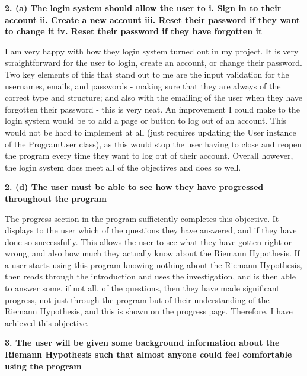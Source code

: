\documentclass[12pt]{article}
\begin{document}
\textbf{2. (a) The login system should allow the user to i. Sign in to their account ii. Create a new account iii. Reset their password if they want to change it iv. Reset their password if they have forgotten it}

I am very happy with how they login system turned out in my project. It is very straightforward for the user to login, create an account, or change their password. Two key elements of this that stand out to me are the input validation for the usernames, emails, and passwords - making sure that they are always of the correct type and structure; and also with the emailing of the user when they have forgotten their password - this is very neat. An improvement I could make to the login system would be to add a page or button to log out of an account. This would not be hard to implement at all (just requires updating the User instance of the ProgramUser class), as this would stop the user having to close and reopen the program every time they want to log out of their account. Overall however, the login system does meet all of the objectives and does so well.

\textbf{2. (d) The user must be able to see how they have progressed throughout the program}

The progress section in the program sufficiently completes this objective. It displays to the user which of the questions they have answered, and if they have done so successfully. This allows the user to see what they have gotten right or wrong, and also how much they actually know about the Riemann Hypothesis. If a user starts using this program knowing nothing about the Riemann Hypothesis, then reads through the introduction and uses the investigation, and is then able to answer some, if not all, of the questions, then they have made significant progress, not just through the program but of their understanding of the Riemann Hypothesis, and this is shown on the progress page. Therefore, I have achieved this objective.

\textbf{3. The user will be given some background information about the Riemann Hypothesis such that almost anyone could feel comfortable using the program}
\end{document}
